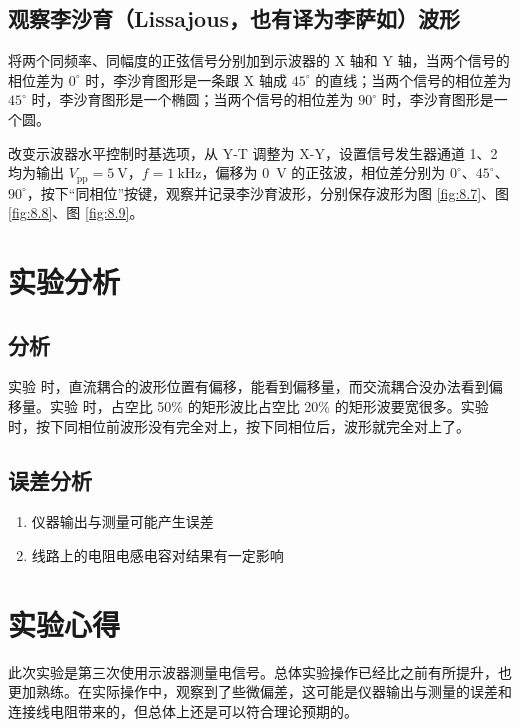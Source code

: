 \documentclass[a4paper,utf8]{article}
\begin{document}
    \subsection{观察李沙育（Lissajous，也有译为李萨如）波形}
    将两个同频率、同幅度的正弦信号分别加到示波器的 X 轴和 Y 轴，当两个信号的相位差为 $0^\circ$ 时，李沙育图形是一条跟 X 轴成 $45^\circ$ 的直线；当两个信号的相位差为 $45^\circ$ 时，李沙育图形是一个椭圆；当两个信号的相位差为 $90^\circ$ 时，李沙育图形是一个圆。\par
    改变示波器水平控制时基选项，从 Y-T 调整为 X-Y，设置信号发生器通道 1、2 均为输出 $V_\text{pp}=\SI{5}{\V}$，$f=\SI{1}{\kilo\Hz}$，偏移为 \SI{0}{\V} 的正弦波，相位差分别为 $0^\circ$、$45^\circ$、$90^\circ$，按下“同相位”按键，观察并记录李沙育波形，分别保存波形为图 \ref{fig:8.7}、图 \ref{fig:8.8}、图 \ref{fig:8.9}。

    \section{实验分析}
    
    \subsection{分析}
    实验 时，直流耦合的波形位置有偏移，能看到偏移量，而交流耦合没办法看到偏移量。实验 时，占空比 50\% 的矩形波比占空比 20\% 的矩形波要宽很多。实验  时，按下同相位前波形没有完全对上，按下同相位后，波形就完全对上了。
    \subsection{误差分析}
        \begin{enumerate}
            \item 仪器输出与测量可能产生误差
            \item 线路上的电阻电感电容对结果有一定影响

        \end{enumerate}
    \section{实验心得}
    此次实验是第三次使用示波器测量电信号。总体实验操作已经比之前有所提升，也更加熟练。在实际操作中，观察到了些微偏差，这可能是仪器输出与测量的误差和连接线电阻带来的，但总体上还是可以符合理论预期的。
    \clearpage
\end{document}
